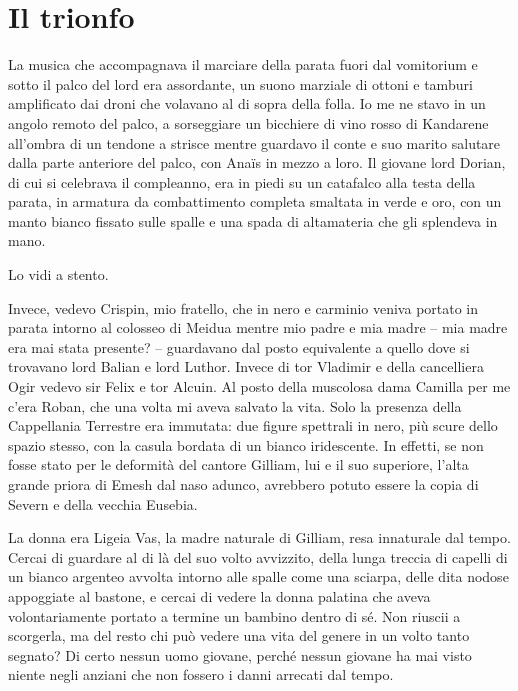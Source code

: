 \chapter{Il trionfo}

La musica che accompagnava il marciare della parata fuori dal vomitorium
e sotto il palco del lord era assordante, un suono marziale di ottoni e
tamburi amplificato dai droni che volavano al di sopra della folla. Io
me ne stavo in un angolo remoto del palco, a sorseggiare un bicchiere di
vino rosso di Kandarene all'ombra di un tendone a strisce mentre
guardavo il conte e suo marito salutare dalla parte anteriore del palco,
con Anaïs in mezzo a loro. Il giovane lord Dorian, di cui si celebrava
il compleanno, era in piedi su un catafalco alla testa della parata, in
armatura da combattimento completa smaltata in verde e oro, con un manto
bianco fissato sulle spalle e una spada di altamateria che gli splendeva
in mano.

Lo vidi a stento.

Invece, vedevo Crispin, mio fratello, che in nero e carminio veniva
portato in parata intorno al colosseo di Meidua mentre mio padre e mia
madre -- mia madre era mai stata presente? -- guardavano dal posto
equivalente a quello dove si trovavano lord Balian e lord Luthor. Invece
di tor Vladimir e della cancelliera Ogir vedevo sir Felix e tor Alcuin.
Al posto della muscolosa dama Camilla per me c'era Roban, che una volta
mi aveva salvato la vita. Solo la presenza della Cappellania Terrestre
era immutata: due figure spettrali in nero, più scure dello spazio
stesso, con la casula bordata di un bianco iridescente. In effetti, se
non fosse stato per le deformità del cantore Gilliam, lui e il suo
superiore, l'alta grande priora di Emesh dal naso adunco, avrebbero
potuto essere la copia di Severn e della vecchia Eusebia.

La donna era Ligeia Vas, la madre naturale di Gilliam, resa innaturale
dal tempo. Cercai di guardare al di là del suo volto avvizzito, della
lunga treccia di capelli di un bianco argenteo avvolta intorno alle
spalle come una sciarpa, delle dita nodose appoggiate al bastone, e
cercai di vedere la donna palatina che aveva volontariamente portato a
termine un bambino dentro di sé. Non riuscii a scorgerla, ma del resto
chi può vedere una vita del genere in un volto tanto segnato? Di certo
nessun uomo giovane, perché nessun giovane ha mai visto niente negli
anziani che non fossero i danni arrecati dal tempo.

